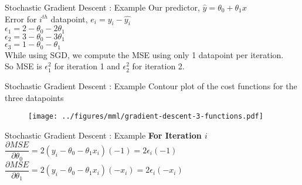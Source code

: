 \documentclass[usenames,dvipsnames]{beamer}
\begin{document}
                        \begin{frame}{Stochastic Gradient Descent : Example}
                        Our predictor, $\hat{y} = \theta_0 + \theta_1x$\\
                        \vspace{1cm}
                        Error for $i^{th}$ datapoint, $e_i = y_i - \hat{y_i}$\\
                        
                        $\epsilon_1 = 2 - \theta_0 - 2\theta_1$ \\
                        $\epsilon_2 = 3 - \theta_0 - 3\theta_1$ \\
                        $\epsilon_3 = 1 - \theta_0 - \theta_1$ \\
                        
                        \vspace{1cm}
                        While using SGD, we compute the MSE using only 1 datapoint per iteration. \\
                        So MSE is $\epsilon_1^2$ for iteration 1 and $\epsilon_2^2$ for iteration 2.
                        \end{frame}

                        \begin{frame}{Stochastic Gradient Descent : Example}
                            Contour plot of the cost functions for the three datapoints
                            \begin{figure}
                                \texttt{[image: ../figures/mml/gradient-descent-3-functions.pdf]}
                            \end{figure}
                        \end{frame}
                        
                        
                        \begin{frame}{Stochastic Gradient Descent : Example}
                        \textbf{For Iteration $i$}\\
                        \vspace{1cm}
                        $\dfrac{\partial MSE}{\partial \theta_0} = 2\left( y_i - \theta_0 -\theta_1x_i \right)\left(-1\right) = 2\epsilon_i\left(-1\right)$ \\
                        \vspace{2cm}
                        $\dfrac{\partial MSE}{\partial \theta_1} = 2\left( y_i - \theta_0 -\theta_1x_i \right)\left(-x_i\right) = 2\epsilon_i\left(-x_i\right)$ 
                        \end{frame}
                        
\end{document}
